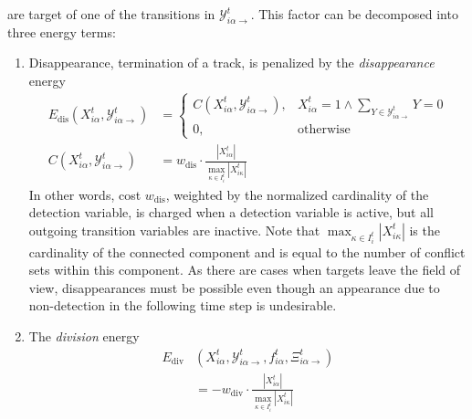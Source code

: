 are target of one of the transitions in $\mathcal{Y}_{i\alpha\rightarrow}^{t}$.  This factor can be
decomposed into three energy terms: \\ %
\begin{enumerate}
      \item Disappearance, \ie termination of a track, is penalized by the \emph{disappearance}
    energy  
    \begin{align}
        \label{eq:energy-dis}
         E_{\mathrm{dis}}(X_{i\alpha}^t,  \mathcal{Y}_{i\alpha\rightarrow}^{t}) &=
        \begin{cases}
            C(X_{i\alpha}^t, \mathcal{Y}_{i\alpha\rightarrow}^{t}), & X_{i\alpha}^t = 1 \wedge
            \sum_{Y\in\mathcal{Y}_{i\alpha\rightarrow}^{t}}Y = 0 \\
            0, & \mathrm{otherwise}
        \end{cases} \\
        C(X_{i\alpha}^t, \mathcal{Y}_{i\alpha\rightarrow}^{t}) &= w_{\mathrm{dis}} \cdot
        \frac{|X_{i\alpha}^t|} {\max_{\kappa \in I_i^t}|X_{i\kappa}^t|} %
    \end{align}
    In other words, cost $w_{\mathrm{dis}}$, weighted by the normalized cardinality of the detection
    variable, is charged when a detection variable is active, but all outgoing transition variables
    are inactive. Note that $\max_{\kappa \in I_i^t}|X_{i\kappa}^t|$ is the cardinality of the
    connected component and is equal to the number of conflict sets within this component. As there
    are cases when targets leave the field of view, disappearances must be possible even though an
    appearance due to non-detection in the following time step is undesirable.
      \item The \emph{division} energy 
    \begin{align}
        \label{eq:energy-div}
        E_{\mathrm{div}}&(X_{i\alpha}^t, \mathcal{Y}_{i\alpha\rightarrow}^{t}, f_{i\alpha}^t,
        \Xi_{i\alpha\rightarrow}^{t}) \\ \nonumber
        &=-w_{\mathrm{div}} \cdot \frac{|X_{i\alpha}^t|} {\max_{\kappa \in I_i^t}|X_{i\kappa}^t|} \\ \nonumber

\end{align}
\end{enumerate}
